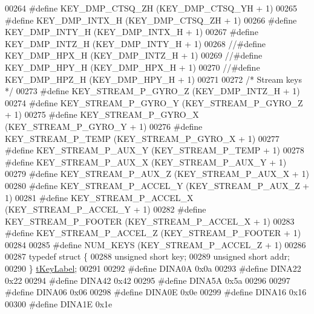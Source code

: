 \begin{DoxyCode}
00264 \textcolor{preprocessor}{#define KEY\_DMP\_CTSQ\_ZH             (KEY\_DMP\_CTSQ\_YH + 1)}
00265 \textcolor{preprocessor}{#define KEY\_DMP\_INTX\_H              (KEY\_DMP\_CTSQ\_ZH + 1)}
00266 \textcolor{preprocessor}{#define KEY\_DMP\_INTY\_H              (KEY\_DMP\_INTX\_H + 1)}
00267 \textcolor{preprocessor}{#define KEY\_DMP\_INTZ\_H              (KEY\_DMP\_INTY\_H + 1)}
00268 \textcolor{comment}{//#define KEY\_DMP\_HPX\_H               (KEY\_DMP\_INTZ\_H + 1)}
00269 \textcolor{comment}{//#define KEY\_DMP\_HPY\_H               (KEY\_DMP\_HPX\_H + 1)}
00270 \textcolor{comment}{//#define KEY\_DMP\_HPZ\_H               (KEY\_DMP\_HPY\_H + 1)}
00271 
00272 \textcolor{comment}{/* Stream keys */}
00273 \textcolor{preprocessor}{#define KEY\_STREAM\_P\_GYRO\_Z         (KEY\_DMP\_INTZ\_H + 1)}
00274 \textcolor{preprocessor}{#define KEY\_STREAM\_P\_GYRO\_Y         (KEY\_STREAM\_P\_GYRO\_Z + 1)}
00275 \textcolor{preprocessor}{#define KEY\_STREAM\_P\_GYRO\_X         (KEY\_STREAM\_P\_GYRO\_Y + 1)}
00276 \textcolor{preprocessor}{#define KEY\_STREAM\_P\_TEMP           (KEY\_STREAM\_P\_GYRO\_X + 1)}
00277 \textcolor{preprocessor}{#define KEY\_STREAM\_P\_AUX\_Y          (KEY\_STREAM\_P\_TEMP + 1)}
00278 \textcolor{preprocessor}{#define KEY\_STREAM\_P\_AUX\_X          (KEY\_STREAM\_P\_AUX\_Y + 1)}
00279 \textcolor{preprocessor}{#define KEY\_STREAM\_P\_AUX\_Z          (KEY\_STREAM\_P\_AUX\_X + 1)}
00280 \textcolor{preprocessor}{#define KEY\_STREAM\_P\_ACCEL\_Y        (KEY\_STREAM\_P\_AUX\_Z + 1)}
00281 \textcolor{preprocessor}{#define KEY\_STREAM\_P\_ACCEL\_X        (KEY\_STREAM\_P\_ACCEL\_Y + 1)}
00282 \textcolor{preprocessor}{#define KEY\_STREAM\_P\_FOOTER         (KEY\_STREAM\_P\_ACCEL\_X + 1)}
00283 \textcolor{preprocessor}{#define KEY\_STREAM\_P\_ACCEL\_Z        (KEY\_STREAM\_P\_FOOTER + 1)}
00284 
00285 \textcolor{preprocessor}{#define NUM\_KEYS                    (KEY\_STREAM\_P\_ACCEL\_Z + 1)}
00286 
00287 \textcolor{keyword}{typedef} \textcolor{keyword}{struct }\{
00288     \textcolor{keywordtype}{unsigned} \textcolor{keywordtype}{short} key;
00289     \textcolor{keywordtype}{unsigned} \textcolor{keywordtype}{short} addr;
00290 \} \hyperlink{structt_key_label}{tKeyLabel};
00291 
00292 \textcolor{preprocessor}{#define DINA0A 0x0a}
00293 \textcolor{preprocessor}{#define DINA22 0x22}
00294 \textcolor{preprocessor}{#define DINA42 0x42}
00295 \textcolor{preprocessor}{#define DINA5A 0x5a}
00296 
00297 \textcolor{preprocessor}{#define DINA06 0x06}
00298 \textcolor{preprocessor}{#define DINA0E 0x0e}
00299 \textcolor{preprocessor}{#define DINA16 0x16}
00300 \textcolor{preprocessor}{#define DINA1E 0x1e}

\end{DoxyCode}
